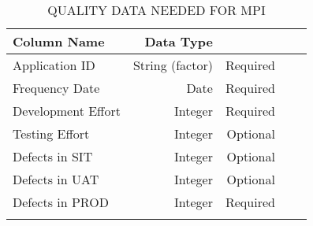 \documentclass[SDSUThesis.tex]{subfiles}
\begin{document}
        \begin{longtable}{@{}l rr rr}
            
            \toprule%
             \centering%
             {\bfseries Column Name}
             & {\bfseries Data Type}
             &  \\
            
            \cmidrule[0.4pt](r{0.125em}){1-1}%
            \cmidrule[0.4pt](lr{0.125em}){2-2}%
            \cmidrule[0.4pt](l{0.125em}){3-3}%
            \endhead
            
            Application ID & String (factor) & Required \\
            \myrowcolour%
            Frequency Date & Date & Required \\
            Development Effort & Integer & Required \\
            \myrowcolour%
            Testing Effort & Integer & Optional \\ 
            Defects in SIT & Integer & Optional \\ 
            \myrowcolour%
            Defects in UAT & Integer  & Optional \\ 
            Defects in PROD & Integer  & Required \\
            
            \bottomrule
            
            \caption{QUALITY DATA NEEDED FOR MPI}
            \label{tab:qualitydata}
        \end{longtable}
        
\end{document}
